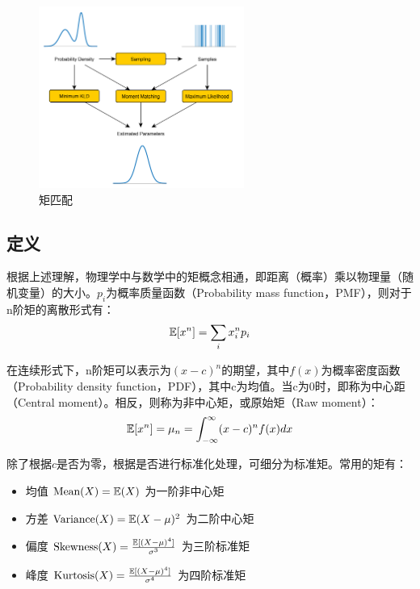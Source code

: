 \documentclass[11pt]{article}
\begin{document}
\begin{figure}[H]
    \centering
    \includegraphics[width=0.6\textwidth]{fig/moment-matching.png}
    \caption{矩匹配}
    \label{fig:moment-match}
\end{figure}

\subsection{定义}

根据上述理解，物理学中与数学中的矩概念相通，即距离（概率）乘以物理量（随机变量）的大小。$p_i$为概率质量函数（Probability mass function，PMF），则对于n阶矩的离散形式有：
\begin{equation*}
    \mathbb{E}[x^n] = \sum_i x_i^n p_i
\end{equation*}

在连续形式下，n阶矩可以表示为$(x-c)^n$的期望，其中$f(x)$为概率密度函数（Probability density function，PDF），其中c为均值。当c为0时，即称为中心距（Central moment）。相反，则称为非中心矩，或原始矩（Raw moment）：
\begin{equation*}
    \mathbb{E}[x^n] = \mu_n = \int_{-\infty}^{\infty} (x-c)^n f(x) dx
\end{equation*}

除了根据$c$是否为零，根据是否进行标准化处理，可细分为标准矩。常用的矩有：
\begin{itemize}
    \item 均值 $\text{Mean}(X)=\mathbb{E}(X)$ 为一阶非中心矩
    \item 方差 $\text{Variance}(X) = \mathbb{E}(X-\mu)^2$ 为二阶中心矩
    \item 偏度 $\text{Skewness}(X) = \frac{\mathbb{E}[(X-\mu)^4]}{\sigma^3}$ 为三阶标准矩 
    \item 峰度 $\text{Kurtosis}(X) = \frac{\mathbb{E}[(X-\mu)^4]}{\sigma^4}$ 为四阶标准矩
\end{itemize}
\end{document}
